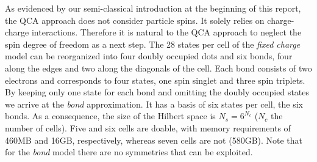 As evidenced by our semi-classical introduction at the beginning of this report,
the QCA approach does not consider particle spins. It solely relies on
charge-charge interactions. Therefore it is natural to the QCA approach to
neglect the spin degree of freedom as a next step. The 28 states per cell of the
\emph{fixed charge} model can be reorganized into four doubly occupied dots and
six bonds, four along the edges and two along the diagonals of the cell. Each
bond consists of two electrons and corresponds to four states, one spin singlet
and three spin triplets. By keeping only one state for each bond and omitting
the doubly occupied states we arrive at the \emph{bond} approximation. It has a
basis of six states per cell, the six bonds. As a consequence, the size of the
Hilbert space is $N_s = 6^{N_c}$ ($N_c$ the number of cells). Five and six cells
are doable, with memory requirements of 460MB and 16GB, respectively, whereas
seven cells are not (580GB). Note that for the \emph{bond} model there are no
symmetries that can be exploited. 

